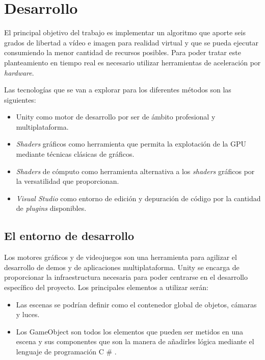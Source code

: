 
\pagestyle{empty}
\chapter {Desarrollo}

El principal objetivo del trabajo es implementar un algoritmo que aporte seis grados de libertad a vídeo e imagen para realidad virtual y que se pueda ejecutar consumiendo la menor cantidad de recursos posibles. Para poder tratar este planteamiento en tiempo real es necesario utilizar herramientas de aceleración por \textit{hardware}.

Las tecnologías que se van a explorar para los diferentes métodos son las siguientes:

\begin{itemize}
\item Unity como motor de desarrollo por ser de ámbito profesional y multiplataforma.
\item \textit{Shaders} gráficos como herramienta que permita la explotación de la GPU mediante técnicas clásicas de gráficos.
\item \textit{Shaders} de cómputo como herramienta alternativa a los \textit{shaders} gráficos por la versatilidad que proporcionan.
\item \textit{Visual Studio} como entorno de edición y depuración de código por la cantidad de \textit{plugins} disponibles.
\end{itemize}

\section{El entorno de desarrollo}

Los motores gráficos y de videojuegos son una herramienta para agilizar el desarrollo de demos y de aplicaciones multiplataforma. Unity se encarga de proporcionar la infraestructura necesaria para poder centrarse en el desarrollo específico del proyecto. Los principales elementos a utilizar serán:

\begin{itemize}
\item Las escenas se podrían definir como el contenedor global de objetos, cámaras y luces.
\item Los GameObject son todos los elementos que pueden ser metidos en una escena y sus componentes que son la manera de añadirles lógica mediante el lenguaje de programación C	\# .
\end{itemize}

